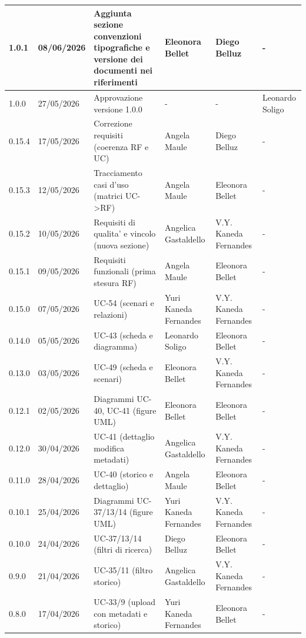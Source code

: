 ﻿\documentclass[a4paper,12pt]{article}
\begin{document}
{\begin{longtable}{|p{1.2cm}|p{1.9cm}|p{4.3cm}|p{2.8cm}|p{2.1cm}|p{2.1cm}|}
    \hline
    1.0.1 & 08/06/2026 & Aggiunta sezione convenzioni tipografiche e versione dei documenti nei riferimenti & Eleonora Bellet & Diego Belluz & - \\
    \hline
    1.0.0 & 27/05/2026 & Approvazione versione 1.0.0 & - & - & Leonardo Soligo \\
    \hline
    \rowcolor{gray!8} 0.15.4 & 17/05/2026 & Correzione requisiti (coerenza RF e UC) & Angela Maule & Diego Belluz & - \\
    \hline
    0.15.3 & 12/05/2026 & Tracciamento casi d'uso (matrici UC->RF) & Angela Maule & Eleonora Bellet & - \\
    \hline
    0.15.2 & 10/05/2026 & Requisiti di qualita' e vincolo (nuova sezione) & Angelica Gastaldello & V.Y. Kaneda Fernandes & - \\
    \hline
    \rowcolor{gray!8} 0.15.1 & 09/05/2026 & Requisiti funzionali (prima stesura RF) & Angela Maule & Eleonora Bellet & - \\
    \hline
    0.15.0 & 07/05/2026 & UC-54 (scenari e relazioni) & Yuri Kaneda Fernandes & V.Y. Kaneda Fernandes & - \\
    \hline
    \rowcolor{gray!8} 0.14.0 & 05/05/2026 & UC-43 (scheda e diagramma) & Leonardo Soligo & Eleonora Bellet & - \\
    \hline
    0.13.0 & 03/05/2026 & UC-49 (scheda e scenari) & Eleonora Bellet & V.Y. Kaneda Fernandes & - \\
    \hline
    \rowcolor{gray!8} 0.12.1 & 02/05/2026 & Diagrammi UC-40, UC-41 (figure UML) & Eleonora Bellet & Eleonora Bellet & - \\
    \hline
    0.12.0 & 30/04/2026 & UC-41 (dettaglio modifica metadati) & Angelica Gastaldello & V.Y. Kaneda Fernandes & - \\
    \hline
    \rowcolor{gray!8} 0.11.0 & 28/04/2026 & UC-40 (storico e dettaglio) & Angela Maule & Eleonora Bellet & - \\
    \hline
    \rowcolor{gray!8} 0.10.1 & 25/04/2026 & Diagrammi UC-37/13/14 (figure UML) & Yuri Kaneda Fernandes & V.Y. Kaneda Fernandes & - \\
    \hline
    0.10.0 & 24/04/2026 & UC-37/13/14 (filtri di ricerca) & Diego Belluz & Eleonora Bellet & - \\
    \hline
    \rowcolor{gray!8} 0.9.0 & 21/04/2026 & UC-35/11 (filtro storico) & Angelica Gastaldello & V.Y. Kaneda Fernandes & - \\
    \hline
    \rowcolor{gray!8} 0.8.0 & 17/04/2026 & UC-33/9 (upload con metadati e storico) & Yuri Kaneda Fernandes & Eleonora Bellet & - \\

\end{longtable}}
\end{document}
